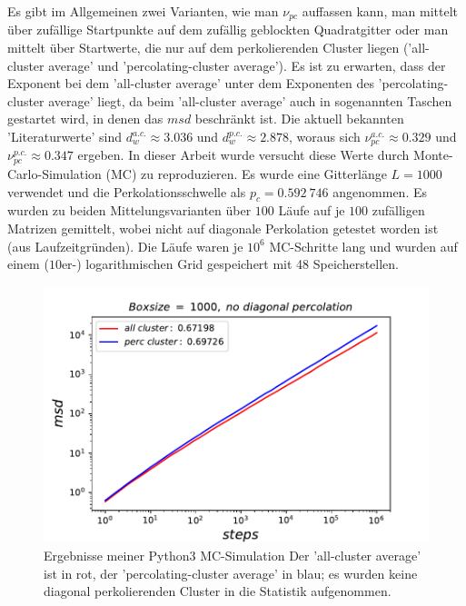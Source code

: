 \documentclass[a4paper, 12pt]{report}
\begin{document}
Es gibt im Allgemeinen zwei Varianten, wie man $\nu_{pc}$ auffassen kann, man mittelt über zufällige Startpunkte auf dem zufällig geblockten Quadratgitter oder man mittelt über Startwerte, die nur auf dem perkolierenden Cluster liegen ('all-cluster average' und 'percolating-cluster average'). Es ist zu erwarten, dass der Exponent bei dem 'all-cluster average' unter dem Exponenten des 'percolating-cluster average' liegt, da beim 'all-cluster average' auch in sogenannten Taschen gestartet wird, in denen das $msd$ beschränkt ist. Die aktuell bekannten 'Literaturwerte' sind $d_w^{a.c.} \approx 3.036$ und $d_w^{p.c.} \approx 2.878$, woraus sich $\nu_{pc}^{a.c.} \approx 0.329$ und $\nu_{pc}^{p.c.} \approx 0.347$ ergeben\cite{GRASSBERGER1999251}. In dieser Arbeit wurde versucht diese Werte durch Monte-Carlo-Simulation (MC) zu reproduzieren. Es wurde eine Gitterlänge $L=1000$ verwendet und die Perkolationsschwelle als $p_c = 0.592\ 746$ angenommen. Es wurden zu beiden Mittelungsvarianten über $100$ Läufe auf je $100$ zufälligen Matrizen gemittelt, wobei nicht auf diagonale Perkolation getestet worden ist (aus Laufzeitgründen). Die Läufe waren je $10^6$ MC-Schritte lang und wurden auf einem ($10$er-) logarithmischen Grid gespeichert mit 48 Speicherstellen. 
\begin{figure}[h!]
	\centering
	\includegraphics[scale=0.9]{acpcold1000.pdf}
	\caption{Ergebnisse meiner Python3 MC-Simulation \break Der 'all-cluster average' ist in rot, der 'percolating-cluster average' in blau; es wurden keine diagonal perkolierenden Cluster in die Statistik aufgenommen.}
\end{figure}
\vspace{0,5cm}
\newpage
\end{document}
